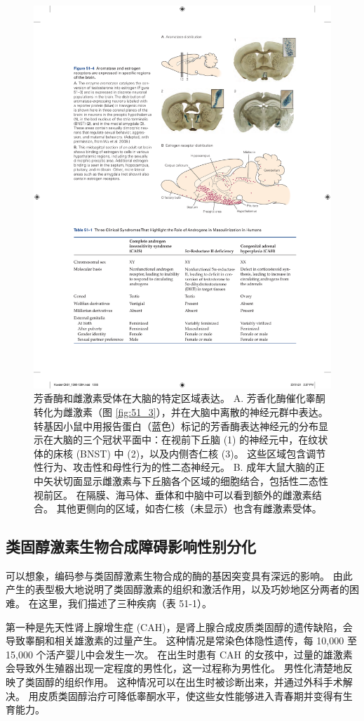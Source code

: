 \begin{figure}[htbp]
	\centering
	\includegraphics[width=0.7\linewidth]{chap51/fig_51_4}
	\caption{芳香酶和雌激素受体在大脑的特定区域表达。 
		A. 芳香化酶催化睾酮转化为雌激素（图 \ref{fig:51_3}），并在大脑中离散的神经元群中表达。
		转基因小鼠中用报告蛋白（蓝色）标记的芳香酶表达神经元的分布显示在大脑的三个冠状平面中：在视前下丘脑 (1) 的神经元中，在纹状体的床核 (BNST) 中 (2)，以及内侧杏仁核 (3)。 这些区域包含调节性行为、攻击性和母性行为的性二态神经元\cite{wu2009estrogen}。
		B. 成年大鼠大脑的正中矢状切面显示雌激素与下丘脑各个区域的细胞结合，包括性二态性视前区。
		在隔膜、海马体、垂体和中脑中可以看到额外的雌激素结合。
		其他更侧向的区域，如杏仁核（未显示）也含有雌激素受体。}
	\label{fig:51_4}
\end{figure}



\subsection{类固醇激素生物合成障碍影响性别分化}

可以想象，编码参与类固醇激素生物合成的酶的基因突变具有深远的影响。
由此产生的表型极大地说明了类固醇激素的组织和激活作用，以及巧妙地区分两者的困难。
在这里，我们描述了三种疾病（表 51-1）。


第一种是先天性肾上腺增生症 (CAH)，是肾上腺合成皮质类固醇的遗传缺陷，会导致睾酮和相关雄激素的过量产生。
这种情况是常染色体隐性遗传，每 10,000 至 15,000 个活产婴儿中会发生一次。
在出生时患有 CAH 的女孩中，过量的雄激素会导致外生殖器出现一定程度的男性化，这一过程称为男性化。
男性化清楚地反映了类固醇的组织作用。
这种情况可以在出生时被诊断出来，并通过外科手术解决。
用皮质类固醇治疗可降低睾酮水平，使这些女性能够进入青春期并变得有生育能力。


